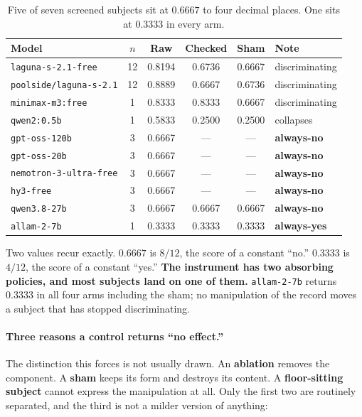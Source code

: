 \documentclass[11pt]{article}
\begin{document}
\begin{table}[h]
\centering
\begin{tabular}{lccccl}
\toprule
Model & $n$ & Raw & Checked & Sham & Note \\
\midrule
\texttt{laguna-s-2.1-free} & 12 & 0.8194 & 0.6736 & 0.6667 & discriminating \\
\texttt{poolside/laguna-s-2.1} & 12 & 0.8889 & 0.6667 & 0.6736 & discriminating \\
\texttt{minimax-m3:free} & 1 & 0.8333 & 0.8333 & 0.6667 & discriminating \\
\texttt{qwen2:0.5b} & 1 & 0.5833 & 0.2500 & 0.2500 & collapses \\
\texttt{gpt-oss-120b} & 3 & 0.6667 & --- & --- & \textbf{always-no} \\
\texttt{gpt-oss-20b} & 3 & 0.6667 & --- & --- & \textbf{always-no} \\
\texttt{nemotron-3-ultra-free} & 3 & 0.6667 & --- & --- & \textbf{always-no} \\
\texttt{hy3-free} & 3 & 0.6667 & --- & --- & \textbf{always-no} \\
\texttt{qwen3.8-27b} & 3 & 0.6667 & 0.6667 & 0.6667 & \textbf{always-no} \\
\texttt{allam-2-7b} & 1 & 0.3333 & 0.3333 & 0.3333 & \textbf{always-yes} \\
\bottomrule
\end{tabular}
\caption{Five of seven screened subjects sit at $0.6667$ to four decimal
places. One sits at $0.3333$ in every arm.}
\end{table}

\noindent
Two values recur exactly. $0.6667$ is $8/12$, the score of a constant ``no.''
$0.3333$ is $4/12$, the score of a constant ``yes.'' \textbf{The instrument has
two absorbing policies, and most subjects land on one of them.}
\texttt{allam-2-7b} returns $0.3333$ in all four arms including the sham; no
manipulation of the record moves a subject that has stopped discriminating.

\paragraph{Three reasons a control returns ``no effect.''} The distinction this
forces is not usually drawn. An \textbf{ablation} removes the component. A
\textbf{sham} keeps its form and destroys its content. A \textbf{floor-sitting
subject} cannot express the manipulation at all. Only the first two are
routinely separated, and the third is not a milder version of anything:
\end{document}
